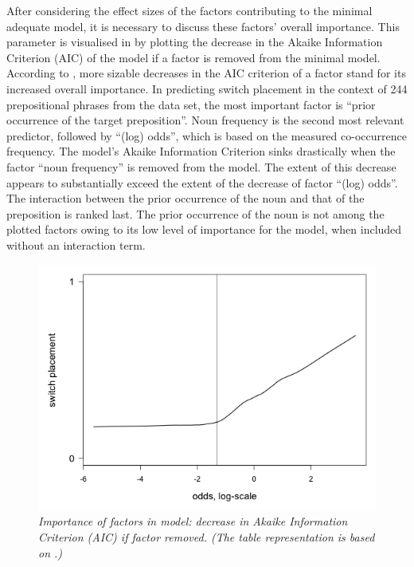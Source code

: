 After considering the effect sizes of the factors contributing to the minimal adequate model, it is necessary to discuss these factors’ overall importance. This parameter is visualised in  by plotting the decrease in the Akaike Information Criterion (AIC) of the model if a factor is removed from the minimal model. According to \citet{szmrecsanyi-2013}, more sizable decreases in the AIC criterion of a factor stand for its increased overall importance. In predicting switch placement in the context of 244 prepositional phrases from the data set, the most important factor is “prior occurrence of the target preposition”. Noun frequency is the second most relevant predictor, followed by “(log) odds”, which is based on the measured co-occurrence frequency. The model's Akaike Information Criterion sinks drastically when the factor “noun frequency” is removed from the model. The extent of this decrease appears to substantially exceed the extent of the decrease of factor “(log) odds”. The interaction between the prior occurrence of the noun and that of the preposition is ranked last. The prior occurrence of the noun is not among the plotted factors owing to its low level of importance for the model, when included without an interaction term.

\begin{figure}
    \centering
	\includegraphics[scale=0.5]{figures/5-Figure_2.png}	
	\caption{\textit{Importance of factors in model: decrease in Akaike Information Criterion (AIC) if factor removed. (The table representation is based on \citealt{szmrecsanyi-2013}.)}}\label{fig:5:5}
\end{figure}

